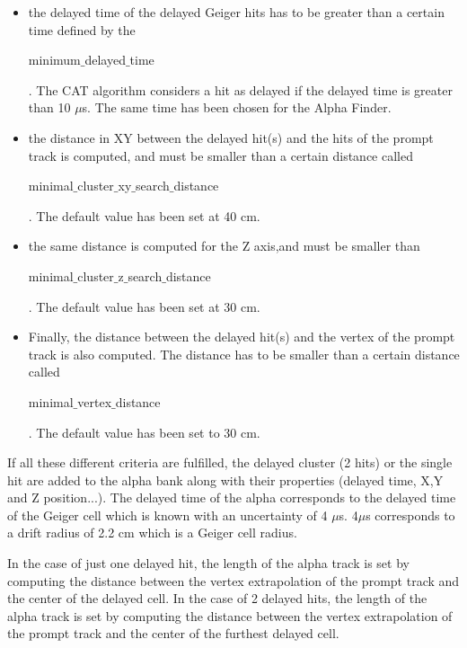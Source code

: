 \documentclass[main.tex]{subfiles}
\begin{document}
\begin{itemize}


\item the delayed time of the delayed Geiger hits has to be greater than a certain time defined by the \begin{ttfamily}minimum$\_$delayed$\_$time\end{ttfamily}. The CAT algorithm considers a hit as delayed if the delayed time is greater than 10 $\mu$s. The same time has been chosen for the Alpha Finder.


\item the distance in XY between the delayed hit(s) and the hits of the prompt track is computed, and must be smaller than a certain distance called \\
\begin{ttfamily}minimal$\_$cluster$\_$xy$\_$search$\_$distance\end{ttfamily}. The default value has been set at 40 cm.


\item the same distance is computed for the Z axis,and must be smaller than \\
 \begin{ttfamily}minimal$\_$cluster$\_$z$\_$search$\_$distance\end{ttfamily}. The default value has been set at 30 cm.


\item Finally, the distance between the delayed hit(s) and the vertex of the prompt track is also computed. The distance has to be smaller than a certain distance called \begin{ttfamily}minimal$\_$vertex$\_$distance\end{ttfamily}. The default value has been set to 30 cm.


\end{itemize}


\noindent If all these different criteria are fulfilled, the delayed cluster (2 hits) or the single hit are added to the alpha bank along with their properties (delayed time, X,Y and Z position...). The delayed time of the alpha corresponds to the delayed time of the Geiger cell which is known with an uncertainty of 4 $\mu$s. 4$\mu$s corresponds to a drift radius of 2.2 cm which is a Geiger cell radius. 


\bigskip


\noindent In the case of just one delayed hit, the length of the alpha track is set by computing the distance between the vertex extrapolation of the prompt track and the center of the delayed cell. In the case of 2 delayed hits, the length of the alpha track is set by computing the distance between the vertex extrapolation of the prompt track and the center of the furthest delayed cell.
\end{document}
